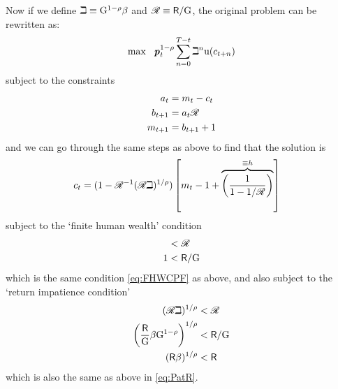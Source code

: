 \documentclass{scrartcl}
\begin{document}
Now if we define $\beth \equiv {\ensuremath{\mathrm{G}}}^{1-\rho}\beta$ and $\mathscr{R} \equiv \mathsf{R}/{\mathrm{G}}$,
the original problem can be rewritten as:
\begin{equation}
\max~~\boldsymbol{\mathit{p}}_{t}^{1-\rho}\sum_{n=0}^{T-t} \beth^{n} \mathrm{u}(c_{t+n})             \label{eq:scaledmaxprob}
\end{equation}
subject to the constraints
\begin{equation}\begin{gathered}\begin{aligned}
   a_{t}   & =  m_{t}-c_{t}
\\ b_{t+1} & =  a_{t}\mathscr{R}
\\ m_{t+1} & =  b_{t+1}+1
\end{aligned}\end{gathered}\end{equation}
and we can go through the same steps as above to find that the solution
is
\begin{equation}\begin{gathered}\begin{aligned}
        c_{t} & =  (1-\mathscr{R}^{-1}(\mathscr{R}\beth)^{1/\rho})\left[m_{t}-1+\overbrace{\left(\frac{1}{1-{1}/\mathscr{R}}\right)}^{\equiv h}\right] \label{eq:normC}
\end{aligned}\end{gathered}\end{equation}
subject to the `finite human wealth' condition
\begin{equation}\begin{gathered}\begin{aligned}
        {1} & <  \mathscr{R}
\\  1 & <  \mathsf{R}/\mathrm{G}
\end{aligned}\end{gathered}\end{equation}
which is the same condition \eqref{eq:FHWCPF} as above, and also subject to the `return impatience condition'
\begin{equation}\begin{gathered}\begin{aligned}
                (\mathscr{R}\beth)^{1/\rho} & <  \mathscr{R}  
\\              \left(\frac{\mathsf{R}}{{\mathrm{G}}}\beta {\ensuremath{\mathrm{G}}}^{1-\rho}\right)^{1/\rho} & <  \mathsf{R}/{\mathrm{G}}  
\\              (\mathsf{R}\beta)^{1/\rho} & <  \mathsf{R}  
\end{aligned}\end{gathered}\end{equation}  
which is also the same as above in \eqref{eq:PatR}.
\end{document}
